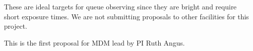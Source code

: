 %
%

\whymdm
These are ideal targets for queue observing since they are bright and require
short exposure times.
We are not submitting proposals to other facilities for this project.

%

\thepast
This is the first proposal for MDM lead by PI Ruth Angus.


